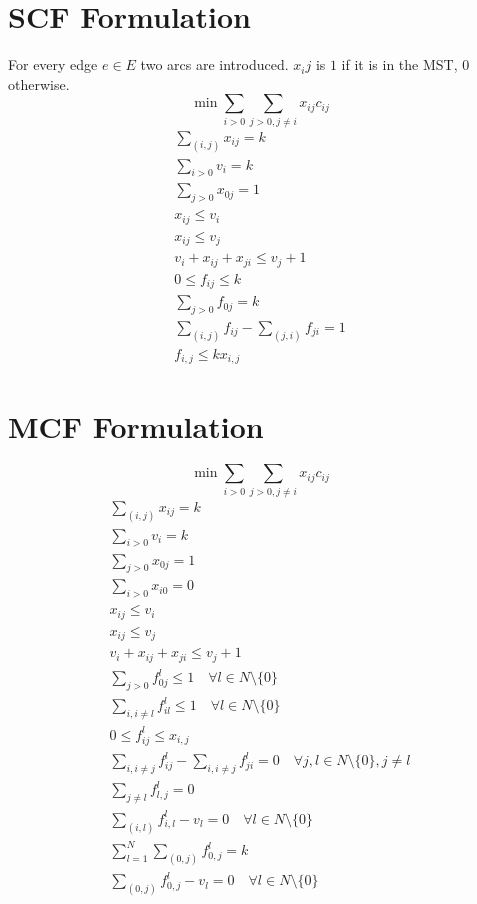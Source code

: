 \documentclass[a4paper]{article}
\numberwithin{equation}{section}
\begin{document}
\section{SCF Formulation}
For every edge $e \in E$ two arcs are introduced. $x_ij$ is $1$ if it is in the MST, $0$ otherwise.
\begin{equation}
	\min \sum_{i>0}{ \sum_{j>0,j\not =i}{x_{ij}c_{ij}}}
\end{equation}
\begin{align}
	\sum_{(i,j)} x_{ij} = k\\
	\sum_{i>0}v_i =k \\
	\sum_{j>0} x_{0j}=1\\
	x_{ij} \leq v_i\\
	x_{ij} \leq v_j\\
	v_i + x_{ij} + x_{ji} \leq v_j + 1\\
	0 \leq f_{ij} \leq k\\
	\sum_{j>0} f_{0j}=k \\
	\sum_{(i,j)} f_{ij} - \sum_{(j,i)} f_{ji} = 1\\
	f_{i,j}\leq kx_{i,j}
\end{align}

\section{MCF Formulation}
\begin{equation}
	\min \sum_{i>0}{ \sum_{j>0,j\not =i}{x_{ij}c_{ij}}}
\end{equation}
\begin{align}
	\sum_{(i,j)} x_{ij} = k\\
	\sum_{i>0}v_i =k \\
	\sum_{j>0} x_{0j}=1\\
	\sum_{i>0} x_{i0}=0\\
	x_{ij} \leq v_i\\
	x_{ij} \leq v_j\\
	v_i + x_{ij} + x_{ji} \leq v_j + 1\\
	\sum_{j>0} f_{0j}^l \leq 1 \quad \forall l\in N\setminus\{0\}\\
	\sum_{i,i\not =l} f_{il}^l \leq 1 \quad \forall l\in N\setminus\{0\}\\
	0\leq f_{ij}^l \leq x_{i,j}\\
	\sum_{i,i\not = j}f_{ij}^l - \sum_{i,i\not = j} f_{ji}^l =0 \quad \forall j, l\in N\setminus\{0\}, j\not =l \\
	\sum_{j\not=l} f_{l,j}^l =0\\
	\sum_{(i,l)} f_{i,l}^l - v_l=0 \quad \forall l\in N\setminus\{0\} \\
	\sum_{l=1}^N \sum_{(0,j)} f_{0,j}^l = k\\
	\sum_{(0,j)} f_{0,j}^l -v_l = 0 \quad \forall l\in N\setminus\{0\}
\end{align}
\end{document}
